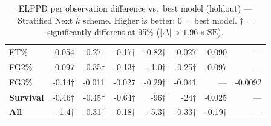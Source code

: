 \begin{table}[H]
{\begin{tabular}{lrrrrrrr}
FT\% & -0.054 & -0.27$\dagger$ & -0.17$\dagger$ & -0.82$\dagger$ & -0.027 & -0.090 & --- \\[2pt]
FG2\% & -0.097 & -0.35$\dagger$ & -0.13$\dagger$ & -1.0$\dagger$ & -0.25$\dagger$ & -0.097 & --- \\[2pt]
FG3\% & -0.14$\dagger$ & -0.011 & -0.027 & -0.29$\dagger$ & -0.041 & --- & -0.0092 \\[2pt]
\midrule
\textbf{Survival} & -0.46$\dagger$ & -0.45$\dagger$ & -0.64$\dagger$ & -96$\dagger$ & -24$\dagger$ & -0.025 & --- \\
\midrule
\textbf{All} & -1.4$\dagger$ & -0.31$\dagger$ & -0.18$\dagger$ & -5.3$\dagger$ & -0.33$\dagger$ & -0.19$\dagger$ & --- \\
\bottomrule
\end{tabular}
}
\caption{ELPPD per observation difference vs.\ best model (holdout) --- Stratified Next $k$ scheme. Higher is better; 0 = best model. $\dagger$ = significantly different at 95\% ($|\Delta|>1.96\times\mathrm{SE}$).}
\label{tab:elppd_stratified_next_k}
\end{table}
